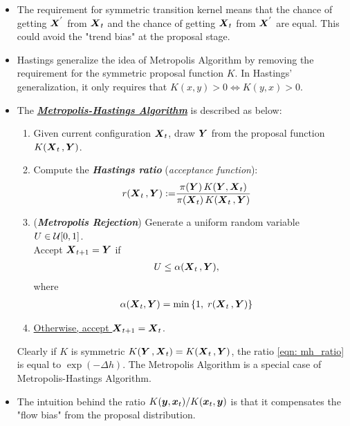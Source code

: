 \documentclass[11pt]{article}
\begin{document}
\begin{itemize}
\item The requirement for symmetric transition kernel means that the chance of getting $\boldsymbol{X}^{'}$ from $\boldsymbol{X}_{t}$ and the chance of getting $\boldsymbol{X}_{t}$ from $\boldsymbol{X}^{'}$ are equal. This could avoid the "trend bias" at the proposal stage.

\item Hastings generalize the idea of Metropolis Algorithm by removing the requirement for the symmetric proposal function $K$. In Hastings' generalization, it only requires that $K(x, y) >0 \Leftrightarrow K(y, x) > 0$.

\item The \underline{\emph{\textbf{Metropolis-Hastings Algorithm}}} is described as below:
\begin{enumerate}
\item Given current configuration $\boldsymbol{X}_{t}$, draw $\boldsymbol{Y}$ from the proposal function $K(\boldsymbol{X}_{t}\,, \boldsymbol{Y})$.

\item Compute the \emph{\textbf{Hastings ratio}} (\emph{acceptance function}):
\begin{align}
r(\boldsymbol{X}_{t}\,, \boldsymbol{Y}):= &\frac{\pi(\boldsymbol{Y})\,K(\boldsymbol{Y}, \boldsymbol{X}_{t})}{\pi(\boldsymbol{X}_{t})\,K(\boldsymbol{X}_{t}\,, \boldsymbol{Y})} \label{eqn: mh_hastings_ratio}
\end{align}

\item (\emph{\textbf{Metropolis Rejection}}) Generate a uniform random variable $U\in {\mathcal U}[0,1]$.\\ 
Accept $\boldsymbol{X}_{t+1} = \boldsymbol{Y}$ if
\begin{align*}
U &\le \alpha(\boldsymbol{X}_{t}\,, \boldsymbol{Y}),
\end{align*} where 
\begin{align*}
\alpha(\boldsymbol{X}_{t}, \boldsymbol{Y}) &= \min\left\{1,\;r(\boldsymbol{X}_{t}\,, \boldsymbol{Y})\right\}
\end{align*}

\item \underline{Otherwise, accept $\boldsymbol{X}_{t+1} = \boldsymbol{X}_{t}$}.
\end{enumerate}
Clearly if $K$ is symmetric $K(\boldsymbol{Y}\,, \boldsymbol{X}_{t}) = K(\boldsymbol{X}_{t}\,, \boldsymbol{Y})$, the ratio \eqref{eqn: mh_ratio} is equal to $\exp(- \Delta h)$. The Metropolis Algorithm is a special case of Metropolis-Hastings Algorithm.

\item The intuition behind the ratio $K(\boldsymbol{y}, \boldsymbol{x}_t)/K(\boldsymbol{x}_t, \boldsymbol{y})$ is that it compensates the "flow bias" from the proposal distribution. 


\end{itemize}
\end{document}
